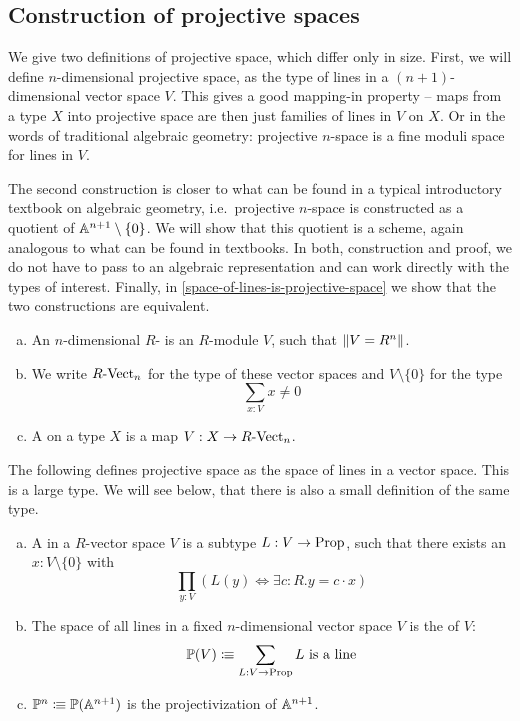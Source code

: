 
\subsection{Construction of projective spaces}
We give two definitions of projective space, which differ only in size.
First, we will define $n$-dimensional projective space,
as the type of lines in a $(n+1)$-dimensional vector space $V$.
This gives a good mapping-in property --
maps from a type $X$ into projective space are then just families of lines in $V$ on $X$.
Or in the words of traditional algebraic geometry:
projective $n$-space is a fine moduli space for lines in $V$.

The second construction is closer to what can be found in a typical
introductory textbook on algebraic geometry,
i.e.\ projective $n$-space is constructed as a quotient of $\mathbb{A}^{n+1}\setminus\{0\}$.
We will show that this quotient is a scheme,
again analogous to what can be found in textbooks.
In both, construction and proof,
we do not have to pass to an algebraic representation
and can work directly with the types of interest.
Finally, in \cref{space-of-lines-is-projective-space}
we show that the two constructions are equivalent.

\begin{definition}%
  \begin{enumerate}[(a)]
  \item An $n$-dimensional $R$- is an $R$-module $V$,
    such that $\lVert  V = R^n  \rVert$. 
  \item We write $R\text{-}\mathrm{Vect}_{n}$ for the type of these vector spaces and $V\setminus\{0\}$ for the type
    \[ \sum_{x:V}x\neq 0\]
  \item A  on a type $X$ is a map $V:X\to R\text{-}\mathrm{Vect}_{n}$. 
  \end{enumerate}
\end{definition}

The following defines projective space as the space of lines in a vector space.
This is a large type.
We will see below, that there is also a small definition of the same type.

\begin{definition}%
  \label{projective-space-as-space-of-lines}
  \begin{enumerate}[(a)]
  \item A  in a $R$-vector space $V$ is a subtype $L:V\to \mathrm{Prop}$,
    such that there exists an $x:V\setminus\{0\}$ with
    \[ \prod_{y:V}\left(L (y) \Leftrightarrow \exists c:R.y=c\cdot x\right)\]
  \item The space of all lines in a fixed $n$-dimensional vector space $V$ is the  of $V$:
    \[ \mathbb{P}(V)\vcentcolon\mspace{-1.2mu}\equiv \sum_{L:V\to \mathrm{Prop}} L \text{ is a line}  \]
  \item {} $\mathbb{P}^n \vcentcolon\mspace{-1.2mu}\equiv \mathbb{P}(\mathbb{A}^{n+1})$ is the projectivization of $\mathbb{A}^{n+1}$.
  \end{enumerate}
\end{definition}

